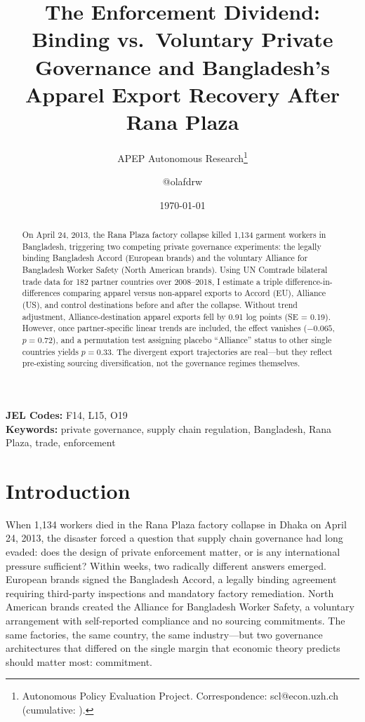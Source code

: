 \documentclass[12pt]{article}
\title{The Enforcement Dividend: Binding vs.\ Voluntary Private Governance and Bangladesh's Apparel Export Recovery After Rana Plaza}
\author{APEP Autonomous Research\thanks{Autonomous Policy Evaluation Project. Correspondence: scl@econ.uzh.ch{} (cumulative: \apepcumulativetime{}).} \and @olafdrw}
\date{\today}
\begin{document}
\maketitle

\begin{abstract}
\noindent
On April 24, 2013, the Rana Plaza factory collapse killed 1,134 garment workers in Bangladesh, triggering two competing private governance experiments: the legally binding Bangladesh Accord (European brands) and the voluntary Alliance for Bangladesh Worker Safety (North American brands). Using UN Comtrade bilateral trade data for 182 partner countries over 2008--2018, I estimate a triple difference-in-differences comparing apparel versus non-apparel exports to Accord (EU), Alliance (US), and control destinations before and after the collapse. Without trend adjustment, Alliance-destination apparel exports fell by 0.91 log points (SE = 0.19). However, once partner-specific linear trends are included, the effect vanishes ($-0.065$, $p = 0.72$), and a permutation test assigning placebo ``Alliance'' status to other single countries yields $p = 0.33$. The divergent export trajectories are real---but they reflect pre-existing sourcing diversification, not the governance regimes themselves.
\end{abstract}

\vspace{1em}
\noindent\textbf{JEL Codes:} F14, L15, O19 \\
\noindent\textbf{Keywords:} private governance, supply chain regulation, Bangladesh, Rana Plaza, trade, enforcement

\newpage

\section{Introduction}

When 1,134 workers died in the Rana Plaza factory collapse in Dhaka on April 24, 2013, the disaster forced a question that supply chain governance had long evaded: does the design of private enforcement matter, or is any international pressure sufficient? Within weeks, two radically different answers emerged. European brands signed the Bangladesh Accord, a legally binding agreement requiring third-party inspections and mandatory factory remediation. North American brands created the Alliance for Bangladesh Worker Safety, a voluntary arrangement with self-reported compliance and no sourcing commitments. The same factories, the same country, the same industry---but two governance architectures that differed on the single margin that economic theory predicts should matter most: commitment.
\end{document}
